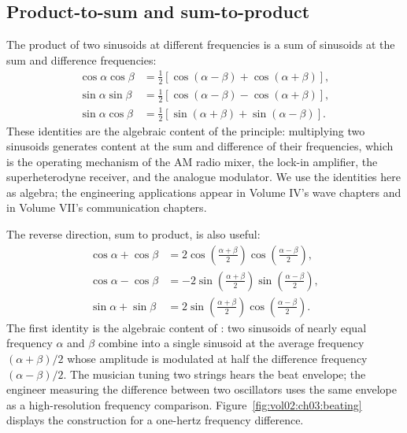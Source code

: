\subsection{Product-to-sum and sum-to-product}

The product of two sinusoids at different frequencies is a sum of
sinusoids at the sum and difference frequencies:
\begin{align*}
\cos\alpha\cos\beta &= \tfrac{1}{2}\left[\cos(\alpha - \beta) + \cos(\alpha + \beta)\right], \\
\sin\alpha\sin\beta &= \tfrac{1}{2}\left[\cos(\alpha - \beta) - \cos(\alpha + \beta)\right], \\
\sin\alpha\cos\beta &= \tfrac{1}{2}\left[\sin(\alpha + \beta) + \sin(\alpha - \beta)\right].
\end{align*}
These identities are the algebraic content of the
 principle: multiplying two sinusoids generates
content at the sum and difference of their frequencies, which is
the operating mechanism of the AM radio mixer, the lock-in
amplifier, the superheterodyne receiver, and the analogue
modulator. We use the identities here as algebra; the engineering
applications appear in Volume IV's wave chapters and in
Volume VII's communication chapters.

The reverse direction, sum to product, is also useful:
\begin{align*}
\cos\alpha + \cos\beta &= 2\cos\left(\tfrac{\alpha + \beta}{2}\right)\cos\left(\tfrac{\alpha - \beta}{2}\right), \\
\cos\alpha - \cos\beta &= -2\sin\left(\tfrac{\alpha + \beta}{2}\right)\sin\left(\tfrac{\alpha - \beta}{2}\right), \\
\sin\alpha + \sin\beta &= 2\sin\left(\tfrac{\alpha + \beta}{2}\right)\cos\left(\tfrac{\alpha - \beta}{2}\right).
\end{align*}
The first identity is the algebraic content of :
two sinusoids of nearly equal frequency $\alpha$ and $\beta$
combine into a single sinusoid at the average frequency
$(\alpha + \beta)/2$ whose amplitude is modulated at half the
difference frequency $(\alpha - \beta)/2$. The musician tuning two
strings hears the beat envelope; the engineer measuring the
difference between two oscillators uses the same envelope as a
high-resolution frequency comparison.
Figure~\ref{fig:vol02:ch03:beating} displays the construction for
a one-hertz frequency difference.



